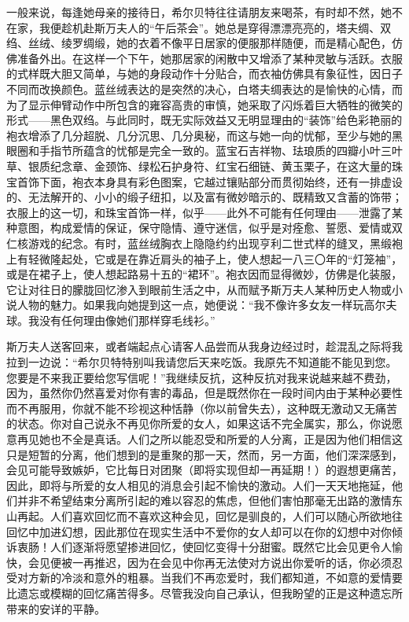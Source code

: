 \par 一般来说，每逢她母亲的接待日，希尔贝特往往请朋友来喝茶，有时却不然，她不在家，我便趁机赴斯万夫人的“午后茶会”。她总是穿得漂漂亮亮的，塔夫绸、双绉、丝绒、绫罗绸缎，她的衣着不像平日居家的便服那样随便，而是精心配色，仿佛准备外出。在这样一个下午，她那居家的闲散中又增添了某种灵敏与活跃。衣服的式样既大胆又简单，与她的身段动作十分贴合，而衣袖仿佛具有象征性，因日子不同而改换颜色。蓝丝绒表达的是突然的决心，白塔夫绸表达的是愉快的心情，而为了显示伸臂动作中所包含的雍容高贵的审慎，她采取了闪烁着巨大牺牲的微笑的形式——黑色双绉。与此同时，既无实际效益又无明显理由的“装饰”给色彩艳丽的袍衣增添了几分超脱、几分沉思、几分奥秘，而这与她一向的忧郁，至少与她的黑眼圈和手指节所蕴含的忧郁是完全一致的。蓝宝石吉祥物、珐琅质的四瓣小叶三叶草、银质纪念章、金颈饰、绿松石护身符、红宝石细链、黄玉栗子，在这大量的珠宝首饰下面，袍衣本身具有彩色图案，它越过镶贴部分而贯彻始终，还有一排虚设的、无法解开的、小小的缎子纽扣，以及富有微妙暗示的、既精致又含蓄的饰带；衣服上的这一切，和珠宝首饰一样，似乎——此外不可能有任何理由——泄露了某种意图，构成爱情的保证，保守隐情、遵守迷信，似乎是对痊愈、誓愿、爱情或双仁核游戏的纪念。有时，蓝丝绒胸衣上隐隐约约出现亨利二世式样的缝叉，黑缎袍上有轻微隆起处，它或是在靠近肩头的袖子上，使人想起一八三〇年的“灯笼袖”，或是在裙子上，使人想起路易十五的“裙环”。袍衣因而显得微妙，仿佛是化装服，它让对往日的朦胧回忆渗入到眼前生活之中，从而赋予斯万夫人某种历史人物或小说人物的魅力。如果我向她提到这一点，她便说：“我不像许多女友一样玩高尔夫球。我没有任何理由像她们那样穿毛线衫。”
\par 斯万夫人送客回来，或者端起点心请客人品尝而从我身边经过时，趁混乱之际将我拉到一边说：“希尔贝特特别叫我请您后天来吃饭。我原先不知道能不能见到您。您要是不来我正要给您写信呢！”我继续反抗，这种反抗对我来说越来越不费劲，因为，虽然你仍然喜爱对你有害的毒品，但是既然你在一段时间内由于某种必要性而不再服用，你就不能不珍视这种恬静（你以前曾失去），这种既无激动又无痛苦的状态。你对自己说永不再见你所爱的女人，如果这话不完全属实，那么，你说愿意再见她也不全是真话。人们之所以能忍受和所爱的人分离，正是因为他们相信这只是短暂的分离，他们想到的是重聚的那一天，然而，另一方面，他们深深感到，会见可能导致嫉妒，它比每日对团聚（即将实现但却一再延期！）的遐想更痛苦，因此，即将与所爱的女人相见的消息会引起不愉快的激动。人们一天天地拖延，他们并非不希望结束分离所引起的难以容忍的焦虑，但他们害怕那毫无出路的激情东山再起。人们喜欢回忆而不喜欢这种会见，回忆是驯良的，人们可以随心所欲地往回忆中加进幻想，因此那位在现实生活中不爱你的女人却可以在你的幻想中对你倾诉衷肠！人们逐渐将愿望掺进回忆，使回忆变得十分甜蜜。既然它比会见更令人愉快，会见便被一再推迟，因为在会见中你再无法使对方说出你爱听的话，你必须忍受对方新的冷淡和意外的粗暴。当我们不再恋爱时，我们都知道，不如意的爱情要比遗忘或模糊的回忆痛苦得多。尽管我没向自己承认，但我盼望的正是这种遗忘所带来的安详的平静。
